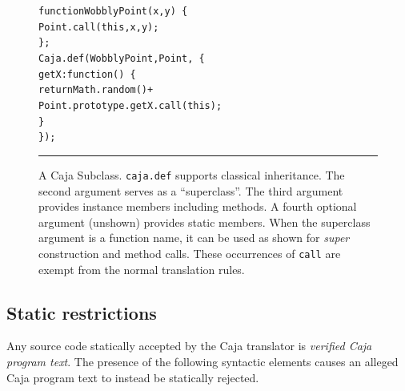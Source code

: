 \documentclass[letterpaper,twocolumn,10pt]{article}
\newcommand{\code}[1]{{\tt {#1}}}              %
\begin{document}

\begin{figure}[t!]
\begin{alltt}
function WobblyPoint(x, y)\ \{
  Point.call(this, x, y);
\};
Caja.def(WobblyPoint, Point,\ \{
  getX: function()\ \{ 
    return Math.random() +
      Point.prototype.getX.call(this); 
  \}
\});
\end{alltt}

\caption[A Caja Subclass.]{A Caja Subclass. \code{caja.def} supports 
classical inheritance. The second argument serves as a ``superclass''. The 
third argument provides instance members including methods. A fourth optional 
argument (unshown) provides static members. When the superclass argument is a 
function name, it can be used as shown for \emph{super} construction and 
method calls. These occurrences of \code{call} are exempt from the normal 
translation rules. \\ } \hrule
\label{fig:caja-subclass}
\end{figure}


\subsection{Static restrictions}

Any source code statically accepted by the Caja translator is \emph{verified 
Caja program text}. The presence of the following syntactic elements causes 
an alleged Caja program text to instead be statically rejected.
\end{document}
